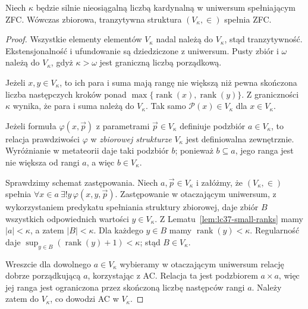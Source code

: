 \begin{twierdzenie}
\label{thm:lc37-rank-model}
Niech $\kappa$ będzie silnie nieosiągalną liczbą kardynalną
w uniwersum spełniającym ZFC. Wówczas zbiorowa,
tranzytywna struktura $(V_\kappa,\in)$ spełnia ZFC.
\end{twierdzenie}
\begin{proof}
Wszystkie elementy elementów $V_\kappa$ nadal
należą do $V_\kappa$, stąd tranzytywność.
Ekstensjonalność i ufundowanie są dziedziczone
z uniwersum. Pusty zbiór i $\omega$ należą do
$V_\kappa$, gdyż $\kappa>\omega$ jest graniczną liczbą porządkową.

Jeżeli $x,y\in V_\kappa$, to ich para i suma
mają rangę nie większą niż pewna skończona
liczba następczych kroków ponad
$\max\{\operatorname{rank}(x),\operatorname{rank}(y)\}$.
Z graniczności $\kappa$ wynika, że para i suma
należą do $V_\kappa$.
Tak samo $\mathcal P(x)\in V_\kappa$ dla
$x\in V_\kappa$.

Jeżeli formuła $\varphi(x,\vec p)$ z parametrami
$\vec p\in V_\kappa$ definiuje podzbiór
$a\in V_\kappa$, to relacja prawdziwości
$\varphi$ w \emph{zbiorowej strukturze} $V_\kappa$
jest definiowalna zewnętrznie.
Wyróżnianie w metateorii daje taki podzbiór $b$;
ponieważ $b\subseteq a$, jego ranga
jest nie większa od rangi $a$, a więc
$b\in V_\kappa$.

Sprawdzimy schemat zastępowania.
Niech $a,\vec p\in V_\kappa$ i załóżmy, że
$(V_\kappa,\in)$ spełnia
$\forall x\in a\ \exists!y\,\varphi(x,y,\vec p)$.
Zastępowanie w otaczającym uniwersum,
z wykorzystaniem predykatu spełniania
struktury zbiorowej, daje zbiór
$B$ wszystkich odpowiednich wartości $y\in V_\kappa$.
Z Lematu~\ref{lem:lc37-small-ranks} mamy
$|a|<\kappa$, a zatem $|B|<\kappa$.
Dla każdego $y\in B$ mamy
$\operatorname{rank}(y)<\kappa$.
Regularność daje
$\sup_{y\in B}(\operatorname{rank}(y)+1)<\kappa$;
stąd $B\in V_\kappa$.

Wreszcie dla dowolnego $a\in V_\kappa$
wybieramy w otaczającym uniwersum
relację dobrze porządkującą $a$,
korzystając z AC. Relacja ta jest
podzbiorem $a\times a$, więc jej ranga
jest ograniczona przez skończoną liczbę
następców rangi $a$. Należy zatem do
$V_\kappa$, co dowodzi AC w $V_\kappa$.
\end{proof}

